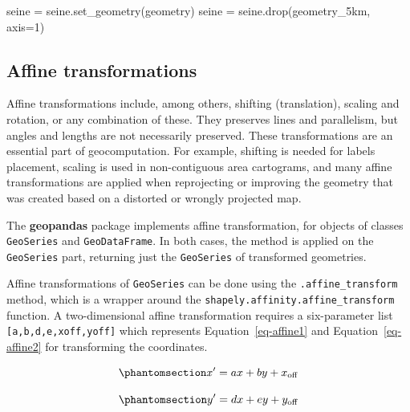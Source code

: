 \documentclass[
  letterpaper,
]{krantz}
\newenvironment{Shaded}{\begin{snugshade}}{\end{snugshade}}
\newcommand{\DecValTok}[1]{\textcolor[rgb]{0.68,0.00,0.00}{#1}}
\newcommand{\NormalTok}[1]{\textcolor[rgb]{0.00,0.23,0.31}{#1}}
\newcommand{\OperatorTok}[1]{\textcolor[rgb]{0.37,0.37,0.37}{#1}}
\newcommand{\StringTok}[1]{\textcolor[rgb]{0.13,0.47,0.30}{#1}}
\begin{document}
\begin{Shaded}
\begin{Highlighting}[]
\NormalTok{seine }\OperatorTok{=}\NormalTok{ seine.set\_geometry(}\StringTok{\textquotesingle{}geometry\textquotesingle{}}\NormalTok{)}
\NormalTok{seine }\OperatorTok{=}\NormalTok{ seine.drop(}\StringTok{\textquotesingle{}geometry\_5km\textquotesingle{}}\NormalTok{, axis}\OperatorTok{=}\DecValTok{1}\NormalTok{)}
\end{Highlighting}
\end{Shaded}

\subsection{Affine transformations}\label{sec-affine-transformations}

Affine transformations include, among others, shifting (translation),
scaling and rotation, or any combination of these. They preserves lines
and parallelism, but angles and lengths are not necessarily preserved.
These transformations are an essential part of geocomputation. For
example, shifting is needed for labels placement, scaling is used in
non-contiguous area cartograms, and many affine transformations are
applied when reprojecting or improving the geometry that was created
based on a distorted or wrongly projected map.

The \textbf{geopandas} package implements affine transformation, for
objects of classes \texttt{GeoSeries} and \texttt{GeoDataFrame}. In both
cases, the method is applied on the \texttt{GeoSeries} part, returning
just the \texttt{GeoSeries} of transformed geometries.

Affine transformations of \texttt{GeoSeries} can be done using the
\texttt{.affine\_transform} method, which is a wrapper around the
\texttt{shapely.affinity.affine\_transform} function. A two-dimensional
affine transformation requires a six-parameter list
\texttt{{[}a,b,d,e,xoff,yoff{]}} which represents
Equation~\ref{eq-affine1} and Equation~\ref{eq-affine2} for transforming
the coordinates.

\begin{equation}\phantomsection\label{eq-affine1}{
x' = a x + b y + x_\mathrm{off}
}\end{equation}

\begin{equation}\phantomsection\label{eq-affine2}{
y' = d x + e y + y_\mathrm{off}
}\end{equation}
\end{document}
